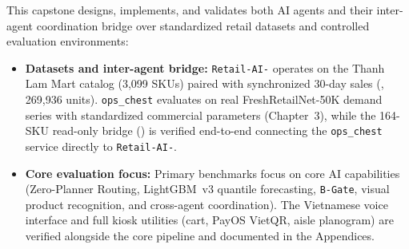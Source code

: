 This capstone designs, implements, and validates both AI agents and their inter-agent coordination bridge over standardized retail datasets and controlled evaluation environments:
\begin{itemize}
    \item \textbf{Datasets and inter-agent bridge:} \texttt{Retail-AI-} operates on the Thanh Lam Mart catalog (3,099 SKUs) paired with synchronized 30-day sales (, 269,936 units). \texttt{ops\_chest} evaluates on real FreshRetailNet-50K demand series with standardized commercial parameters (Chapter~3), while the 164-SKU read-only bridge () is verified end-to-end connecting the \texttt{ops\_chest} service directly to \texttt{Retail-AI-}.
    \item \textbf{Core evaluation focus:} Primary benchmarks focus on core AI capabilities (Zero-Planner Routing, LightGBM~v3 quantile forecasting, \texttt{B-Gate}, visual product recognition, and cross-agent coordination). The Vietnamese voice interface and full kiosk utilities (cart, PayOS VietQR, aisle planogram) are verified alongside the core pipeline and documented in the Appendices.
\end{itemize}
